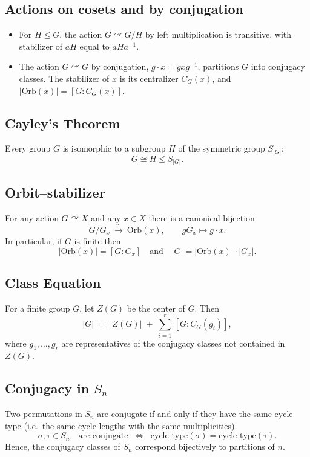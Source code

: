 \documentclass[12pt]{article}
\begin{document}
\subsection{Actions on cosets and by conjugation}
\begin{itemize}[leftmargin=1.2em]
  \item For $H\leq G$, the action $G\curvearrowright G/H$ by left multiplication is transitive, with stabilizer of $aH$ equal to $aHa^{-1}$. 
  \item The action $G\curvearrowright G$ by conjugation, $g\cdot x=gxg^{-1}$, partitions $G$ into conjugacy classes. 
        The stabilizer of $x$ is its centralizer $C_G(x)$, and $|\mathrm{Orb}(x)|=[G:C_G(x)]$.
\end{itemize}

\subsection{Cayley's Theorem}
Every group $G$ is isomorphic to a subgroup $H$ of the symmetric group $S_{|G|}$:
\[
G \cong H \leq S_{|G|}.
\]

\subsection{Orbit--stabilizer}
For any action $G\curvearrowright X$ and any $x\in X$ there is a canonical bijection
\[
G/G_x\ \xrightarrow{\ \sim\ }\ \mathrm{Orb}(x),\qquad gG_x\longmapsto g\cdot x.
\]
In particular, if $G$ is finite then
\[
|\mathrm{Orb}(x)|=[G:G_x]\quad\text{and}\quad |G|=|\mathrm{Orb}(x)|\cdot |G_x|.
\]

\subsection{Class Equation}
For a finite group $G$, let $Z(G)$ be the center of $G$. Then
\[
|G| \;=\; |Z(G)| \;+\; \sum_{i=1}^r \,[G : C_G(g_i)],
\]
where $g_1, \dots, g_r$ are representatives of the conjugacy classes not contained in $Z(G)$.

\subsection{Conjugacy in $S_n$}
Two permutations in $S_n$ are conjugate if and only if they have the same cycle type
(i.e.\ the same cycle lengths with the same multiplicities).
\[
\sigma, \tau \in S_n \quad\text{are conjugate} \;\;\Longleftrightarrow\;\;
\text{cycle-type}(\sigma) = \text{cycle-type}(\tau).
\]
Hence, the conjugacy classes of $S_n$ correspond bijectively to partitions of $n$.
\end{document}
